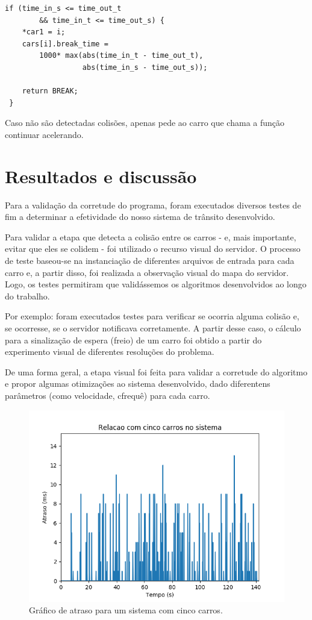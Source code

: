 \documentclass[10pt,twocolumn,letterpaper]{article}
\begin{document}
\begin{lstlisting}[caption={Continuação do algoritmo de detecção de colisão (3)}, label=Algorithm]
if (time_in_s <= time_out_t 
        && time_in_t <= time_out_s) {
    *car1 = i;
    cars[i].break_time = 
        1000* max(abs(time_in_t - time_out_t), 
                  abs(time_in_s - time_out_s));
    
    return BREAK;
 }
\end{lstlisting}

Caso não são detectadas colisões, apenas pede ao carro que chama a função continuar acelerando.

\section{Resultados e discussão}
Para a validação da corretude do programa, foram executados diversos testes de fim a determinar a efetividade do nosso sistema de trânsito desenvolvido.

Para validar a etapa que detecta a colisão entre os carros - e, mais importante, evitar que eles se colidem - foi utilizado o recurso visual do servidor. O processo de teste baseou-se na instanciação de diferentes arquivos de entrada para cada carro e, a partir disso, foi realizada a observação visual do mapa do servidor. Logo, os testes permitiram que validássemos os algoritmos desenvolvidos ao longo do trabalho.

Por exemplo: foram executados testes para verificar se ocorria alguma colisão e, se ocorresse, se o servidor notificava corretamente. A partir desse caso, o cálculo para a sinalização de espera (freio) de um carro foi obtido a partir do experimento visual de diferentes resoluções do problema.

De uma forma geral, a etapa visual foi feita para validar a corretude do algoritmo e propor algumas otimizações ao sistema desenvolvido, dado diferentens parâmetros (como velocidade, cfrequê) para cada carro.

\begin{figure}[ht!]
    \center\includegraphics[width=.75\hsize]{img/cinco}
    \caption{Gráfico de atraso para um sistema com cinco carros.}
\end{figure}
\end{document}
